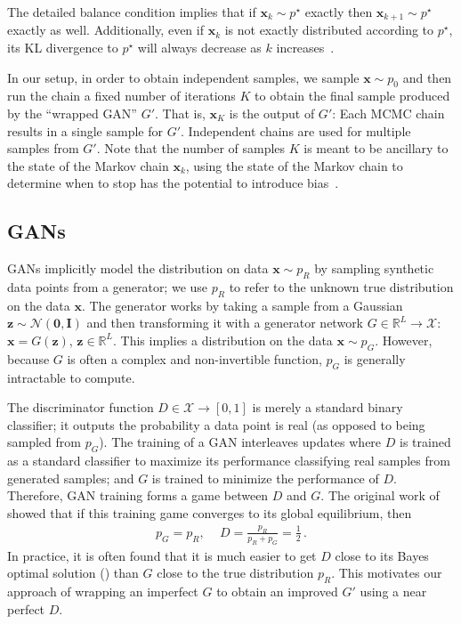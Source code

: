\documentclass{article}
\renewcommand{\vec}[1]{{\boldsymbol{\mathbf{#1}}}} %
\newcommand{\mat}[1]{{\ensuremath{\mathbf{#1}}}} %
\newcommand{\R}{\mathbb{R}}
\newcommand{\set}[1]{\mathcal{#1}}
\newcommand{\sample}{\sim}
\newcommand{\norm}{\mathcal{N}}
\newcommand{\target}{{p^\star}}
\newcommand{\pinit}{{p_0}}
\newcommand{\PG}{{p_G}}
\newcommand{\PR}{{p_R}}
\newcommand{\setx}{\set{X}}
\begin{document}
The detailed balance condition implies that if $\vec x_k \sample \target$ exactly then $\vec x_{k+1} \sample \target$ exactly as well.
Additionally, even if $\vec x_k$ is not exactly distributed according to $\target$, its KL divergence to $\target$ will always decrease as $k$ increases~\citep{Murray2008,Cover2012}.

In our setup, in order to obtain independent samples, we sample $\vec x \sample \pinit$ and then run the chain a fixed number of iterations $K$ to obtain the final sample produced by the ``wrapped GAN'' $G'$.
That is, $\vec x_K$ is the output of $G'$: Each MCMC chain results in a single sample for $G'$.
Independent chains are used for multiple samples from $G'$.
Note that the number of samples $K$ is meant to be ancillary to the state of the Markov chain $\vec x_k$, using the state of the Markov chain to determine when to stop has the potential to introduce bias~\citep{Cowles1999}.

\subsection{GANs}

GANs implicitly model the distribution on data $\vec x \sample \PR$ by sampling synthetic data points from a generator; we use $\PR$ to refer to the unknown true distribution on the data $\vec x$.
The generator works by taking a sample from a Gaussian $\vec z \sample \norm(\vec 0,\mat I)$ and then transforming it with a generator network $G \in \R^L \rightarrow \setx$: $\vec x = G(\vec z)$, $\vec z \in \R^L$.
This implies a distribution on the data $\vec x \sample \PG$.
However, because $G$ is often a complex and non-invertible function, $\PG$ is generally intractable to compute.

The discriminator function $D \in \setx \rightarrow [0,1]$ is merely a standard binary classifier; it outputs the probability a data point is real (as opposed to being sampled from $\PG$)\@.
The training of a GAN interleaves updates where $D$ is trained as a standard classifier to maximize its performance classifying real samples from generated samples; and $G$ is trained to minimize the performance of $D$.
Therefore, GAN training forms a game between $D$ and $G$.
The original work of~\citet{Goodfellow2014} showed that if this training game converges to its global equilibrium, then
\begin{align}
  \PG = \PR,\, \quad D = \frac{\PR}{\PR + \PG} = \frac{1}{2}\,.
\end{align}
In practice, it is often found that it is much easier to get $D$ close to its Bayes optimal solution (\smash{$\PR/(\PR + \PG)$}) than $G$ close to the true distribution $\PR$.
This motivates our approach of wrapping an imperfect $G$ to obtain an improved $G'$ using a near perfect $D$.
\end{document}
